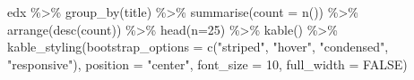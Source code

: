 \documentclass[
]{article}
\newenvironment{Shaded}{}{}
\newcommand{\AttributeTok}[1]{\textcolor[rgb]{0.49,0.56,0.16}{#1}}
\newcommand{\ConstantTok}[1]{\textcolor[rgb]{0.53,0.00,0.00}{#1}}
\newcommand{\DecValTok}[1]{\textcolor[rgb]{0.25,0.63,0.44}{#1}}
\newcommand{\FunctionTok}[1]{\textcolor[rgb]{0.02,0.16,0.49}{#1}}
\newcommand{\NormalTok}[1]{#1}
\newcommand{\SpecialCharTok}[1]{\textcolor[rgb]{0.25,0.44,0.63}{#1}}
\newcommand{\StringTok}[1]{\textcolor[rgb]{0.25,0.44,0.63}{#1}}
\begin{document}
\begin{Shaded}
\begin{Highlighting}[]
\NormalTok{edx }\SpecialCharTok{\%\textgreater{}\%}
   \FunctionTok{group\_by}\NormalTok{(title) }\SpecialCharTok{\%\textgreater{}\%}
   \FunctionTok{summarise}\NormalTok{(}\AttributeTok{count =} \FunctionTok{n}\NormalTok{()) }\SpecialCharTok{\%\textgreater{}\%}
   \FunctionTok{arrange}\NormalTok{(}\FunctionTok{desc}\NormalTok{(count)) }\SpecialCharTok{\%\textgreater{}\%}
   \FunctionTok{head}\NormalTok{(}\AttributeTok{n=}\DecValTok{25}\NormalTok{) }\SpecialCharTok{\%\textgreater{}\%}
   \FunctionTok{kable}\NormalTok{() }\SpecialCharTok{\%\textgreater{}\%}
   \FunctionTok{kable\_styling}\NormalTok{(}\AttributeTok{bootstrap\_options =} \FunctionTok{c}\NormalTok{(}\StringTok{"striped"}\NormalTok{, }\StringTok{"hover"}\NormalTok{, }\StringTok{"condensed"}\NormalTok{, }\StringTok{"responsive"}\NormalTok{),}
                 \AttributeTok{position =} \StringTok{"center"}\NormalTok{,}
                 \AttributeTok{font\_size =} \DecValTok{10}\NormalTok{,}
                 \AttributeTok{full\_width =} \ConstantTok{FALSE}\NormalTok{)}
\end{Highlighting}
\end{Shaded}
\end{document}
